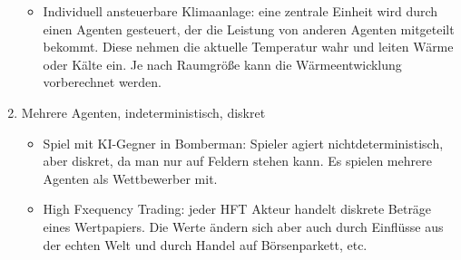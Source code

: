 \begin{enumerate}[label=\alph*)]
\begin{itemize}
		\item Individuell ansteuerbare Klimaanlage: eine zentrale Einheit wird durch einen Agenten gesteuert, der die Leistung von anderen Agenten mitgeteilt bekommt. Diese nehmen die aktuelle Temperatur wahr und leiten Wärme oder Kälte ein. Je nach Raumgröße kann die Wärmeentwicklung vorberechnet werden.
	\end{itemize}
	
	\item Mehrere Agenten, indeterministisch, diskret
	\begin{itemize}
		\item Spiel mit KI-Gegner in Bomberman: Spieler agiert nichtdeterministisch, aber diskret, da man nur auf Feldern stehen kann. Es spielen mehrere Agenten als Wettbewerber mit.
		
		\item High Fxequency Trading: jeder HFT Akteur handelt diskrete Beträge eines Wertpapiers. Die Werte ändern sich aber auch durch Einflüsse aus der echten Welt und durch Handel auf Börsenparkett, etc.
	\end{itemize}
\end{enumerate}